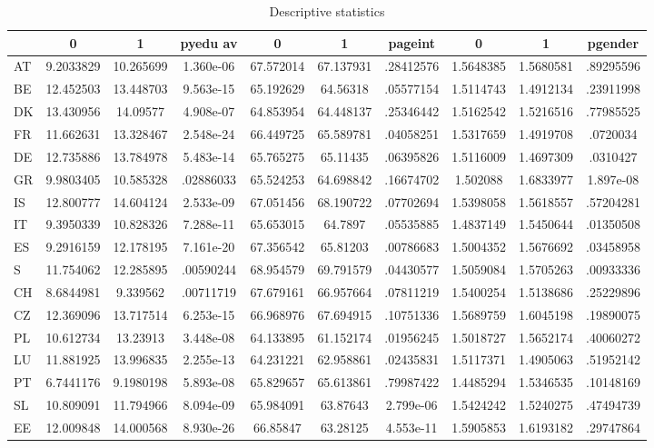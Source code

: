 \begin{table}[htbp]
\caption{\label{clabel} Descriptive statistics}\centering\medskip
\begin{tabular}{|l|c|c|c|c|c|c|c|c|c|}\hline  
 & 0  & 1  & pyedu av  & 0  & 1  & pageint  & 0  & 1  & pgender  \\ \hline  
AT & 9.2033829 & 10.265699 & 1.360e-06 & 67.572014 & 67.137931 & .28412576 & 1.5648385 & 1.5680581 & .89295596 \\ \hline 
BE & 12.452503 & 13.448703 & 9.563e-15 & 65.192629 & 64.56318 & .05577154 & 1.5114743 & 1.4912134 & .23911998 \\ \hline 
DK & 13.430956 & 14.09577 & 4.908e-07 & 64.853954 & 64.448137 & .25346442 & 1.5162542 & 1.5216516 & .77985525 \\ \hline 
FR & 11.662631 & 13.328467 & 2.548e-24 & 66.449725 & 65.589781 & .04058251 & 1.5317659 & 1.4919708 & .0720034 \\ \hline 
DE & 12.735886 & 13.784978 & 5.483e-14 & 65.765275 & 65.11435 & .06395826 & 1.5116009 & 1.4697309 & .0310427 \\ \hline 
GR & 9.9803405 & 10.585328 & .02886033 & 65.524253 & 64.698842 & .16674702 & 1.502088 & 1.6833977 & 1.897e-08 \\ \hline 
IS & 12.800777 & 14.604124 & 2.533e-09 & 67.051456 & 68.190722 & .07702694 & 1.5398058 & 1.5618557 & .57204281 \\ \hline 
IT & 9.3950339 & 10.828326 & 7.288e-11 & 65.653015 & 64.7897 & .05535885 & 1.4837149 & 1.5450644 & .01350508 \\ \hline 
ES & 9.2916159 & 12.178195 & 7.161e-20 & 67.356542 & 65.81203 & .00786683 & 1.5004352 & 1.5676692 & .03458958 \\ \hline 
S & 11.754062 & 12.285895 & .00590244 & 68.954579 & 69.791579 & .04430577 & 1.5059084 & 1.5705263 & .00933336 \\ \hline 
CH & 8.6844981 & 9.339562 & .00711719 & 67.679161 & 66.957664 & .07811219 & 1.5400254 & 1.5138686 & .25229896 \\ \hline 
CZ & 12.369096 & 13.717514 & 6.253e-15 & 66.968976 & 67.694915 & .10751336 & 1.5689759 & 1.6045198 & .19890075 \\ \hline 
PL & 10.612734 & 13.23913 & 3.448e-08 & 64.133895 & 61.152174 & .01956245 & 1.5018727 & 1.5652174 & .40060272 \\ \hline 
LU & 11.881925 & 13.996835 & 2.255e-13 & 64.231221 & 62.958861 & .02435831 & 1.5117371 & 1.4905063 & .51952142 \\ \hline 
PT & 6.7441176 & 9.1980198 & 5.893e-08 & 65.829657 & 65.613861 & .79987422 & 1.4485294 & 1.5346535 & .10148169 \\ \hline 
SL & 10.809091 & 11.794966 & 8.094e-09 & 65.984091 & 63.87643 & 2.799e-06 & 1.5424242 & 1.5240275 & .47494739 \\ \hline 
EE & 12.009848 & 14.000568 & 8.930e-26 & 66.85847 & 63.28125 & 4.553e-11 & 1.5905853 & 1.6193182 & .29747864 \\ \hline 
  \end{tabular}
\end{table}
